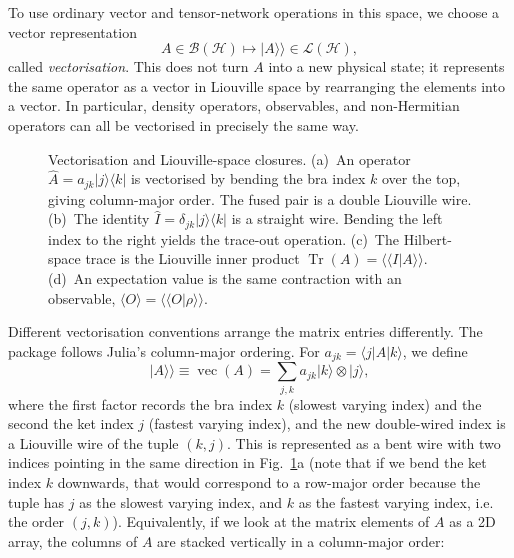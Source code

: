 To use ordinary vector and tensor-network operations in this space, we choose a vector representation
%
\begin{equation}
    A\in\mathcal B(\mathcal H) \longmapsto \lvert A\rangle\!\rangle\in\mathcal L(\mathcal H),
\end{equation}
%
called \emph{vectorisation}.
This does not turn \(A\) into a new physical state; it represents the same operator as a vector in Liouville space by rearranging the elements into a vector.
In particular, density operators, observables, and non-Hermitian operators can all be vectorised in precisely the same way.
%
\begin{figure}[H]
    \centering
    
    \caption{Vectorisation and Liouville-space closures.
    (a)~An operator \(\hat A=a_{jk}\lvert j\rangle\langle k\rvert\) is vectorised by bending the bra index \(k\) over the top, giving column-major order.
    The fused pair is a double Liouville wire.
    (b)~The identity \(\hat I=\delta_{jk}\lvert j\rangle\langle k\rvert\) is a straight wire.
    Bending the left index to the right yields the trace-out operation.
    (c)~The Hilbert-space trace is the Liouville inner product \(\operatorname{Tr}(A)=\langle\!\langle I\vert A\rangle\!\rangle\).
    (d)~An expectation value is the same contraction with an observable, \(\langle O\rangle=\langle\!\langle O\vert\rho\rangle\!\rangle\).}
    \label{fig:wire-bending-vectorisation}
\end{figure}
%
Different vectorisation conventions arrange the matrix entries differently.
The package follows Julia's column-major ordering.
For \(a_{jk}=\langle j\vert A\vert k\rangle\), we define
%
\begin{equation}
    \lvert A\rangle\!\rangle \equiv \operatorname{vec}(A)
    = \sum_{j,k} a_{jk} \lvert k\rangle\otimes\lvert j\rangle,
    \label{eq:column-vectorisation}
\end{equation}
%
where the first factor records the bra index \(k\) (slowest varying index) and the second the ket index \(j\) (fastest varying index), and the new double-wired index is a Liouville wire of the tuple \((k,j)\).
This is represented as a bent wire with two indices pointing in the same direction in Fig.~\ref{fig:wire-bending-vectorisation}a (note that if we bend the ket index \(k\) downwards, that would correspond to a row-major order because the tuple has \(j\) as the slowest varying index, and \(k\) as the fastest varying index, i.e. the order \((j,k)\)).
Equivalently, if we look at the matrix elements of \(A\) as a 2D array, the columns of \(A\) are stacked vertically in a column-major order:
